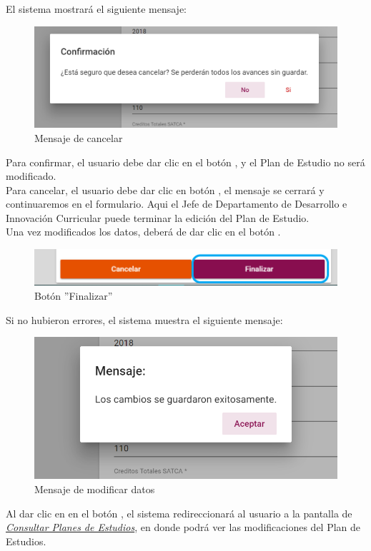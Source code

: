 El sistema mostrará el siguiente mensaje:
\begin{figure}[!hbtp]
	\centering
	\hypertarget{ms1}{\includegraphics[width=0.7\linewidth]{images/SP4-GPE/m1}}
	\caption{Mensaje de cancelar}
	\label{ms1}
\end{figure}

Para confirmar, el usuario debe dar clic en el botón  , y el Plan de Estudio no será modificado.\\

Para cancelar, el usuario debe dar clic en botón  , el mensaje se cerrará y continuaremos en el formulario. Aqui el Jefe de Departamento de Desarrollo e Innovación Curricular puede terminar la edición del Plan de Estudio.\\

Una vez modificados los datos, deberá de dar clic en el botón  .
\begin{figure}[!hbtp]
	\centering
	\hypertarget{btnfin}{\includegraphics[width=0.7\linewidth]{images/SP4-GPE/editarPER}}
	\caption{Botón ''Finalizar''}
	\label{btnfin}
\end{figure}

Si no hubieron errores, el sistema muestra el siguiente mensaje:
\begin{figure}[!hbtp]
	\centering
	\hypertarget{ms2}{\includegraphics[width=0.7\linewidth]{images/SP4-GPE/m2}}
	\caption{Mensaje de modificar datos}
	\label{ms2}
\end{figure}


Al dar clic en en el botón  , el sistema redireccionará al usuario a la pantalla de \hyperlink{consultarPE}{\textit{Consultar Planes de Estudios}}, en donde podrá ver las modificaciones del Plan de Estudios.\\
\newpage

